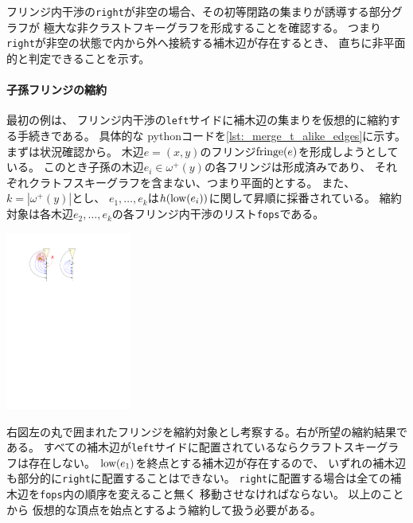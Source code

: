 フリンジ内干渉の{\tt right}が非空の場合、その初等閉路の集まりが誘導する部分グラフが
極大な非クラストフキーグラフを形成することを確認する。
つまり
{\tt right}が非空の状態で内から外へ接続する補木辺が存在するとき、
直ちに非平面的と判定できることを示す。





\begin{paracol}{2}
\paragraph{子孫フリンジの縮約}
最初の例は、
フリンジ内干渉の{\tt left}サイドに補木辺の集まりを仮想的に縮約する手続きである。
具体的な pythonコードを\lstrefname\ref{lst:_merge_t_alike_edges}に示す。
まずは状況確認から。
木辺$e=(x,y)$のフリンジ$\operatorname{fringe}(e)$を形成しようとしている。
このとき子孫の木辺$e_i \in \omega^+(y)$の各フリンジは形成済みであり、
それぞれクラトフスキーグラフを含まない、つまり平面的とする。
また、$k=|\omega^+(y)|$とし、
$e_1, \ldots, e_k$は$h(\operatorname{low}(e_i))$に関して昇順に採番されている。
縮約対象は各木辺$e_2, \ldots, e_k$の各フリンジ内干渉のリスト{\tt fops}である。


\switchcolumn
\vspace{.5\intextsep}
\centering
\includegraphics[width=0.31\textwidth]{figures/merge_t_alike_edges.pdf}

\end{paracol}


右図左の丸で囲まれたフリンジを縮約対象とし考察する。右が所望の縮約結果である。
すべての補木辺が{\tt left}サイドに配置されているならクラフトスキーグラフは存在しない。
$\operatorname{low}(e_1)$を終点とする補木辺が存在するので、
いずれの補木辺も部分的に{\tt right}に配置することはできない。
{\tt right}に配置する場合は全ての補木辺を{\tt fops}内の順序を変えること無く
移動させなければならない。
以上のことから
仮想的な頂点を始点とするよう縮約して扱う必要がある。




